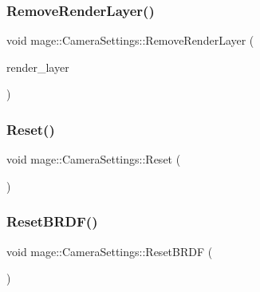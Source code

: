 \subsubsection{\texorpdfstring{Remove\+Render\+Layer()}{RemoveRenderLayer()}}
{\footnotesize\ttfamily void mage\+::\+Camera\+Settings\+::\+Remove\+Render\+Layer (\begin{DoxyParamCaption}\item[{\hyperlink{namespacemage_a4091cc4d4d64a0fd31fd96c2ef7af761}{Render\+Layer}}]{render\+\_\+layer }\end{DoxyParamCaption})\hspace{0.3cm}{\ttfamily [noexcept]}}

\hypertarget{classmage_1_1_camera_settings_a4894cae6954c111339be554e8dd9562c}{}\label{classmage_1_1_camera_settings_a4894cae6954c111339be554e8dd9562c} 
\subsubsection{\texorpdfstring{Reset()}{Reset()}}
{\footnotesize\ttfamily void mage\+::\+Camera\+Settings\+::\+Reset (\begin{DoxyParamCaption}{ }\end{DoxyParamCaption})\hspace{0.3cm}{\ttfamily [noexcept]}}

\hypertarget{classmage_1_1_camera_settings_a1f8b3952282d153db4fb6416e9d933b7}{}\label{classmage_1_1_camera_settings_a1f8b3952282d153db4fb6416e9d933b7} 
\subsubsection{\texorpdfstring{Reset\+B\+R\+D\+F()}{ResetBRDF()}}
{\footnotesize\ttfamily void mage\+::\+Camera\+Settings\+::\+Reset\+B\+R\+DF (\begin{DoxyParamCaption}{ }\end{DoxyParamCaption})\hspace{0.3cm}{\ttfamily [noexcept]}}

\hypertarget{classmage_1_1_camera_settings_afc9bcdb1f27adfb1c69a668a24113b46}{}\label{classmage_1_1_camera_settings_afc9bcdb1f27adfb1c69a668a24113b46} 
